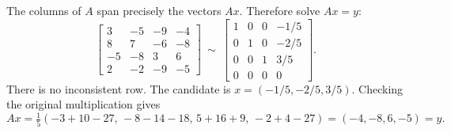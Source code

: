 The columns of $A$ span precisely the vectors $Ax$. Therefore solve $Ax=y$:
\[
 \left[\begin{array}{rrr|r}
 3&-5&-9&-4\\8&7&-6&-8\\-5&-8&3&6\\2&-2&-9&-5
 \end{array}\right]\ \sim\
 \left[\begin{array}{rrr|r}1&0&0&-1/5\\0&1&0&-2/5\\0&0&1&3/5\\0&0&0&0\end{array}\right].
\]
There is no inconsistent row. The candidate is $x=(-1/5,-2/5,3/5)$.
Checking the original multiplication gives
\[
 Ax=\tfrac15(-3+10-27,\,-8-14-18,\,5+16+9,\,-2+4-27)
 =(-4,-8,6,-5)=y.
\]

